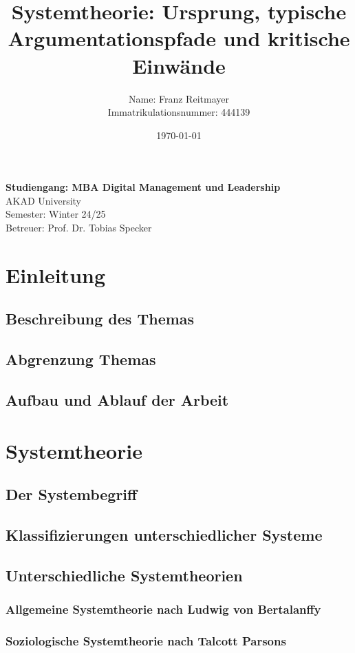 \documentclass[a4paper,12pt]{article}
\title{Systemtheorie: Ursprung, typische Argumentationspfade und kritische Einwände}
\author{Name: Franz Reitmayer \\ Immatrikulationsnummer: 444139}
\date{\today}
\begin{document}
\maketitle
\vfill
\begin{center}
\textbf{Studiengang: MBA Digital Management und Leadership} \\
AKAD University \\
Semester: Winter 24/25 \\
Betreuer: Prof. Dr. Tobias Specker
\end{center}
\vfill
\newpage
\tableofcontents
\newpage


\section{Einleitung}
\subsection{Beschreibung des Themas}
\subsection{Abgrenzung Themas}
\subsection{Aufbau und Ablauf der Arbeit}


\section{Systemtheorie}
\subsection{Der Systembegriff}
\subsection{Klassifizierungen unterschiedlicher Systeme}
\subsection{Unterschiedliche Systemtheorien}
\subsubsection{Allgemeine Systemtheorie nach Ludwig von Bertalanffy}
\subsubsection{Soziologische Systemtheorie nach Talcott Parsons}
\end{document}
